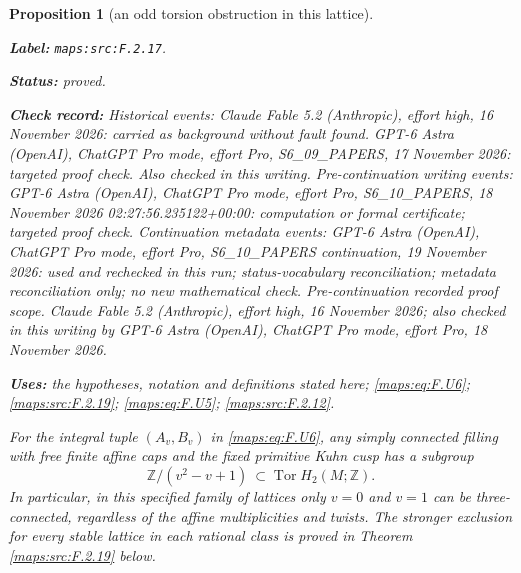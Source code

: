 \documentclass[11pt,a4paper]{article}
\newtheorem{proposition}[proposition]{Proposition}
\theoremstyle{definition}
\newcommand{\StatementRecord}[4]{\par\smallskip\begingroup\upshape\raggedright\noindent\textbf{Label:} \nolinkurl{#1}.\par\noindent\textbf{Status:} #2.\par\noindent\textbf{Check record:} #3.\par\noindent\textbf{Uses:} #4.\par\endgroup\smallskip}
\begin{document}
\begin{proposition}[an odd torsion obstruction in this lattice]\label{maps:src:F.2.17}
\StatementRecord{maps:src:F.2.17}{proved}{Historical events: Claude Fable 5.2 (Anthropic), effort high, 16 November 2026: carried as background without fault found. GPT-6 Astra (OpenAI), ChatGPT Pro mode, effort Pro, S6\_09\_PAPERS, 17 November 2026: targeted proof check. Also checked in this writing. Pre-continuation writing events: GPT-6 Astra (OpenAI), ChatGPT Pro mode, effort Pro, S6\_10\_PAPERS, 18 November 2026 02:27:56.235122+00:00: computation or formal certificate; targeted proof check. Continuation metadata events: GPT-6 Astra (OpenAI), ChatGPT Pro mode, effort Pro, S6\_10\_PAPERS continuation, 19 November 2026: used and rechecked in this run; status-vocabulary reconciliation; metadata reconciliation only; no new mathematical check. \emph{Pre-continuation recorded proof scope.} Claude Fable 5.2 (Anthropic), effort high, 16 November 2026; also checked in this writing by GPT-6 Astra (OpenAI), ChatGPT Pro mode, effort Pro, 18 November 2026}{the hypotheses, notation and definitions stated here; \cref{maps:eq:F.U6}; \cref{maps:src:F.2.19}; \cref{maps:eq:F.U5}; \cref{maps:src:F.2.12}}


For the integral tuple $(A_v,B_v)$ in \eqref{maps:eq:F.U6}, any simply
connected filling with free finite affine caps and the fixed
primitive Kuhn cusp has a subgroup
\[
 \mathbb Z/(v^2-v+1)\ \subset\operatorname{Tor}H_2(M;\mathbb Z).
 \tag{F.U9}\label{maps:eq:F.U9}
\]
In particular, in this specified family of lattices only
$v=0$ and $v=1$ can be three-connected, regardless of the
affine multiplicities and twists.  The stronger exclusion for every stable lattice in each
rational class is proved in Theorem \ref{maps:src:F.2.19} below.

\end{proposition}
\end{document}
